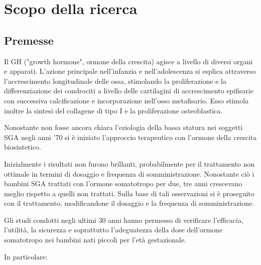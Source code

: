 \chapter{Scopo della ricerca}

\section{Premesse}


Il GH ("growth hormone", ormone della crescita) agisce a livello di diversi organi e apparati.
L'azione principale nell'infanzia e nell'adolescenza si esplica attraverso l'accrescimento
longitudinale delle ossa, stimolando la proliferazione e la differenziazione dei condrociti
a livello delle cartilagini di accrescimento epifisarie con successiva calcificazione
e incorporazione nell'osso metafisario. Esso stimola inoltre la sintesi del collagene 
di tipo I e la proliferazione osteoblastica.\cite{sga}


Nonostante non fosse ancora chiara l'eziologia della bassa statura nei soggetti SGA
negli anni '70 si è iniziato l'approccio terapeutico con l'ormone della crescita biosintetico.


Inizialmente i risultati non furono brillanti, probabilmente per il trattamento non 
ottimale in termini di dosaggio e frequenza di somministrazione. Nonostante ciò i 
bambini SGA trattati con l'ormone somatotropo per due, tre anni crescevano meglio
rispetto a quelli non trattati. Sulla base di tali osservazioni si è proseguito con
il trattamento, modificandone il dosaggio e la frequenza di somministrazione.
 

Gli studi condotti negli ultimi 30 anni hanno permesso di verificare l'efficacia,
l'utilit{\`a}, la sicurezza e soprattutto l'adeguatezza della dose dell'ormone somatotropo
nei bambini nati piccoli per l'et{\`a} gestazionale.


In particolare:

